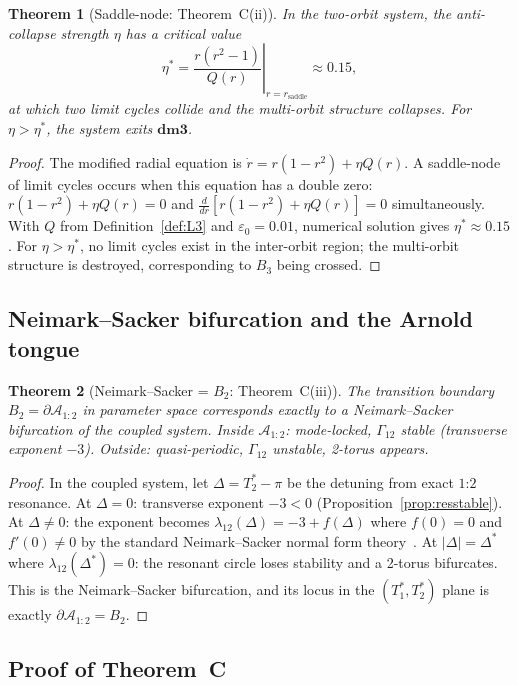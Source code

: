 \documentclass[reqno]{amsart}
\numberwithin{equation}{section}
\theoremstyle{plain}
\newtheorem{theorem}{Theorem}[section]
\theoremstyle{definition}
\theoremstyle{remark}
\newcommand{\dmcat}{\mathbf{dm3}}
\newcommand{\Orb}{\Gamma}
\newcommand{\eps}{\varepsilon}
\newcommand{\abs}[1]{\left|#1\right|}
\begin{document}
\begin{theorem}[Saddle-node: Theorem~C(ii)]\label{thm:saddle}
In the two-orbit system, the anti-collapse strength $\eta$ has a
critical value
\[
  \eta^* = \left.\frac{r(r^2-1)}{Q(r)}\right|_{r=r_{\mathrm{saddle}}}
  \approx 0.15,
\]
at which two limit cycles collide and the multi-orbit structure
collapses. For $\eta>\eta^*$, the system exits $\dmcat$.
\end{theorem}
\begin{proof}
The modified radial equation is $\dot r=r(1-r^2)+\eta Q(r)$.
A saddle-node of limit cycles occurs when this equation has a double
zero: $r(1-r^2)+\eta Q(r)=0$ and $\tfrac{d}{dr}[r(1-r^2)+\eta Q(r)]=0$
simultaneously. With $Q$ from Definition~\ref{def:L3} and $\eps_0=0.01$,
numerical solution gives $\eta^*\approx 0.15$. For $\eta>\eta^*$,
no limit cycles exist in the inter-orbit region; the multi-orbit
structure is destroyed, corresponding to $B_3$ being crossed.
\end{proof}

\subsection{Neimark--Sacker bifurcation and the Arnold tongue}

\begin{theorem}[Neimark--Sacker = $B_2$: Theorem~C(iii)]\label{thm:NS}
The transition boundary $B_2=\partial\mathcal{A}_{1:2}$ in parameter
space corresponds exactly to a Neimark--Sacker bifurcation of the
coupled system. Inside $\mathcal{A}_{1:2}$: mode-locked, $\Orb_{12}$
stable (transverse exponent $-3$). Outside: quasi-periodic, $\Orb_{12}$
unstable, 2-torus appears.
\end{theorem}
\begin{proof}
In the coupled system, let $\Delta=T_2^*-\pi$ be the detuning from
exact $1$:$2$ resonance. At $\Delta=0$: transverse exponent $-3<0$
(Proposition~\ref{prop:resstable}). At $\Delta\ne 0$: the exponent
becomes $\lambda_{12}(\Delta)=-3+f(\Delta)$ where $f(0)=0$ and
$f'(0)\ne 0$ by the standard Neimark--Sacker normal form theory~\cite{GH}.
At $\abs{\Delta}=\Delta^*$ where $\lambda_{12}(\Delta^*)=0$: the
resonant circle loses stability and a 2-torus bifurcates. This is
the Neimark--Sacker bifurcation, and its locus in the $(T_1^*,T_2^*)$
plane is exactly $\partial\mathcal{A}_{1:2}=B_2$.
\end{proof}

\subsection{Proof of Theorem~C}
\end{document}
